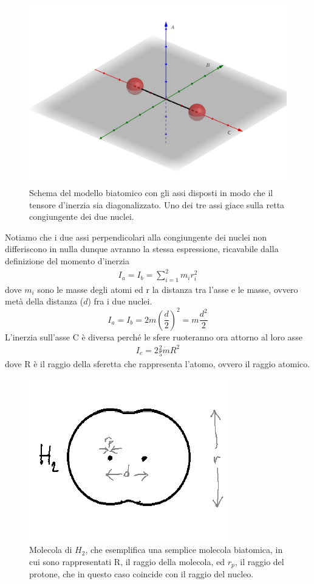 \documentclass[10pt,a4paper]{article}
\begin{document}
\begin{figure}[h!]
	\centering
	\includegraphics[width=0.6\linewidth]{../images/modello_biatomico1}
	\caption{Schema del modello biatomico con gli assi disposti in modo che il tensore d'inerzia sia diagonalizzato. Uno dei tre assi giace sulla retta congiungente dei due nuclei.}
	\label{fig:modellobiatomico1}
\end{figure}
\FloatBarrier
Notiamo che i due assi perpendicolari alla congiungente dei nuclei non differiscono in nulla dunque avranno la stessa espressione, ricavabile dalla definizione del momento d'inerzia
\begin{align*} 
I_a=I_b=\sum_{i=1}^{2}m_ir_i^2
\end{align*} 
dove \(m_i\) sono le masse degli atomi ed r la distanza tra l'asse e le masse, ovvero metà della distanza (\(d\)) fra i due nuclei. 
\[I_a=I_b=2 m \left(\frac{d}{2}\right)^2 = m\frac{d^2}{2}\]
L'inerzia sull'asse C è diversa perché le sfere ruoteranno ora attorno al loro asse
\begin{align*} 
	I_c = 2 \frac{2}{5}m R^2 
\end{align*} 
dove R è il raggio della sferetta che rappresenta l'atomo, ovvero il raggio atomico.
\begin{figure}[h!]
	\centering
	\includegraphics[width=0.4\linewidth]{../images/molecolaH2}
	\caption{Molecola di $H_2$, che esemplifica una semplice molecola biatomica, in cui sono rappresentati R, il raggio della molecola, ed $r_p$, il raggio del protone, che in questo caso coincide con il raggio del nucleo.}
	\label{fig:molecolah2}
\end{figure}
\end{document}
